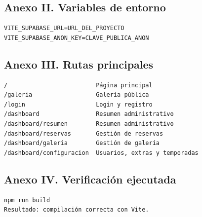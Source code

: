 \documentclass[11pt,a4paper]{article}
\begin{document}
\subsection{Anexo II. Variables de entorno}
\begin{verbatim}
VITE_SUPABASE_URL=URL_DEL_PROYECTO
VITE_SUPABASE_ANON_KEY=CLAVE_PUBLICA_ANON
\end{verbatim}

\subsection{Anexo III. Rutas principales}
\begin{verbatim}
/                         Página principal
/galeria                  Galería pública
/login                    Login y registro
/dashboard                Resumen administrativo
/dashboard/resumen        Resumen administrativo
/dashboard/reservas       Gestión de reservas
/dashboard/galeria        Gestión de galería
/dashboard/configuracion  Usuarios, extras y temporadas
\end{verbatim}

\subsection{Anexo IV. Verificación ejecutada}
\begin{verbatim}
npm run build
Resultado: compilación correcta con Vite.
\end{verbatim}
\end{document}
